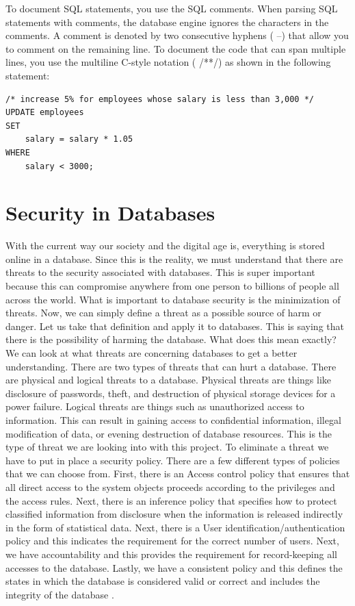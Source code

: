 To document SQL statements, you use the SQL comments. When parsing SQL statements with comments, the database engine ignores the characters in the comments. A comment is denoted by two consecutive hyphens ( --) that allow you to comment on the remaining line. To document the code that can span multiple lines, you use the multiline C-style notation ( /**/) as shown in the following statement:


\bigskip
\bigskip
\begin{lstlisting}
/* increase 5% for employees whose salary is less than 3,000 */
UPDATE employees
SET
    salary = salary * 1.05
WHERE
    salary < 3000;
\end{lstlisting}
\cite{sqltutorial}
\bigskip
\bigskip


\section{Security in Databases}
\label{sec:security in databases}

With the current way our society and the digital age is, everything is stored online in a database. Since this is the reality, we must understand that there are threats to the security associated with databases. This is super important because this can compromise anywhere from one person to billions of people all across the world. What is important to database security is the minimization of threats. Now, we can simply define a threat as a possible source of harm or danger. Let us take that definition and apply it to databases. This is saying that there is the possibility of harming the database. What does this mean exactly? We can look at what threats are concerning databases to get a better understanding. There are two types of threats that can hurt a database. There are physical and logical threats to a database. Physical threats are things like disclosure of passwords, theft, and destruction of physical storage devices for a power failure. Logical threats are things such as unauthorized access to information. This can result in gaining access to confidential information, illegal modification of data, or evening destruction of database resources. This is the type of threat we are looking into with this project. To eliminate a threat we have to put in place a security policy. There are a few different types of policies that we can choose from. First, there is an Access control policy that ensures that all direct access to the system objects proceeds according to the privileges and the access rules. Next, there is an inference policy that specifies how to protect classified information from disclosure when the information is released indirectly in the form of statistical data. Next, there is a User identification/authentication policy and this indicates the requirement for the correct number of users. Next, we have accountability and this provides the requirement for record-keeping all accesses to the database. Lastly, we have a consistent policy and this defines the states in which the database is considered valid or correct and includes the integrity of the database \cite{baraani1996security}.



